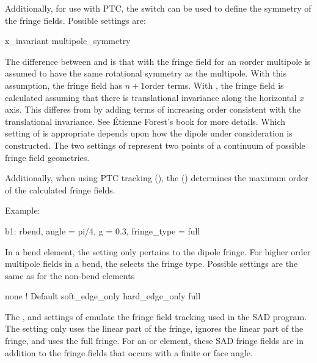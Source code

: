 Additionally, for use with PTC, the  switch can be used
to define the symmetry of the fringe fields. Possible settings are:
\begin{example}
  x_invariant
  multipole_symmetry
\end{example}
The difference between  and  is
that with  the fringe field for an $n$\Th order
multipole is assumed to have the same rotational symmetry as the
multipole. With this assumption, the fringe field has $n+1$\St order
terms.  With , the fringe field is calculated assuming
that there is translational invariance along the horizontal $x$
axis. This differes from  by adding terms of
increasing order consistent with the translational invariance. See
\'Etienne Forest's book\cite{b:forest} for more details. Which setting
of  is appropriate depends upon how the dipole
under consideration is constructed. The two settings of
 represent two points of a continuum of
possible fringe field geometries.

Additionally, when using PTC tracking (), the
 () determines the
maximum order of the calculated fringe fields.

Example:
\begin{example}
  b1: rbend, angle = pi/4, g = 0.3, fringe_type = full
\end{example}

In a bend element, the  setting only pertains to the
dipole fringe.  For higher order multipole fields in a bend, the
 selects the fringe type. Possible
settings are the same as for the non-bend  elements
\begin{example}
  none              ! Default 
  soft_edge_only
  hard_edge_only
  full
\end{example}

The ,  and  settings
of  emulate the fringe field tracking used in the SAD
program\cite{b:sad}.  The  setting only uses the linear
part of the fringe,  ignores the linear part of
the fringe, and  uses the full fringe.  For an 
or  element, these SAD fringe fields are in addition to the
fringe fields that occurs with a finite  or  face
angle. 

